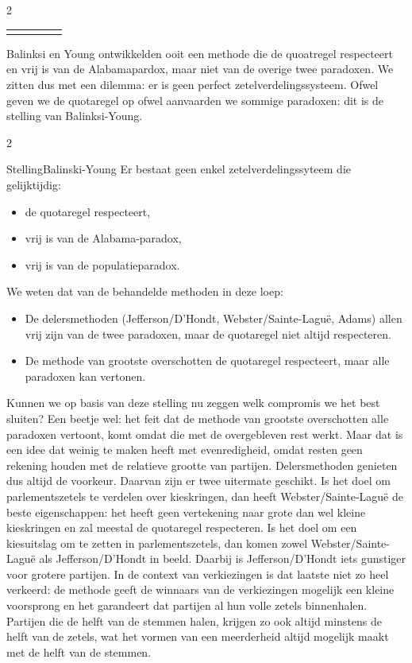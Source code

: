 \begin{multicols}{2}
\begin{tabel}
\begin{tabular}{crrrr}
   

			\hlinethick
		\end{tabular}
		\caption{De quotaregel respecteren leidt tot de populatieparadox}\label{fanquota2}
\end{tabel}

Balinksi en Young ontwikkelden ooit een methode die de quoatregel respecteert en vrij is van de Alabamapardox, maar niet van de overige twee paradoxen. We zitten dus met een dilemma: er is geen perfect zetelverdelingssysteem.
Ofwel geven we de quotaregel op ofwel aanvaarden we sommige paradoxen:  dit is de stelling van Balinksi-Young.
\end{multicols} 
\vspace{-5mm}
\vspace{-15mm}
\begin{multicols}{2}
\begin{kader}{Stelling}{Balinski-Young}
Er bestaat geen enkel zetelverdelingssyteem die gelijktijdig:
\begin{itemize}
    \item de quotaregel respecteert,
 \item vrij is van de Alabama-paradox,
  \item vrij is van de populatieparadox.
\end{itemize}
\end{kader}
We weten dat van de behandelde methoden in deze loep:
\begin{itemize}
    \item De delersmethoden (Jefferson/D'Hondt, Webster/Sainte-Laguë, Adams) allen vrij zijn van de twee paradoxen, maar de quotaregel niet altijd respecteren.
    \item De methode van grootste overschotten de quotaregel respecteert, maar alle paradoxen kan vertonen.
\end{itemize}
Kunnen we op basis van deze stelling nu zeggen welk compromis we het best sluiten? Een beetje wel: het feit dat de methode van grootste overschotten alle paradoxen vertoont, komt omdat die met de overgebleven rest werkt. Maar dat is een idee dat weinig te maken heeft met evenredigheid, omdat resten geen rekening houden met de relatieve grootte van partijen. Delersmethoden genieten dus altijd de voorkeur. Daarvan zijn er twee uitermate geschikt. Is het doel om parlementszetels te verdelen over kieskringen, dan heeft Webster/Sainte-Laguë de beste eigenschappen: het heeft geen vertekening naar grote dan wel kleine kieskringen en zal meestal de quotaregel respecteren. Is het doel om een kiesuitslag om te zetten in parlementszetels, dan komen zowel Webster/Sainte-Laguë als Jefferson/D'Hondt in beeld. Daarbij is Jefferson/D'Hondt iets gunstiger voor grotere partijen. In de context van verkiezingen is dat laatste niet zo heel verkeerd: de methode geeft de winnaars van de verkiezingen mogelijk een kleine voorsprong en het garandeert dat partijen al hun volle zetels binnenhalen. Partijen die de helft van de stemmen halen, krijgen zo ook altijd minstens de helft van de zetels, wat het vormen van een meerderheid altijd mogelijk maakt met de helft van de stemmen.


\end{multicols}
